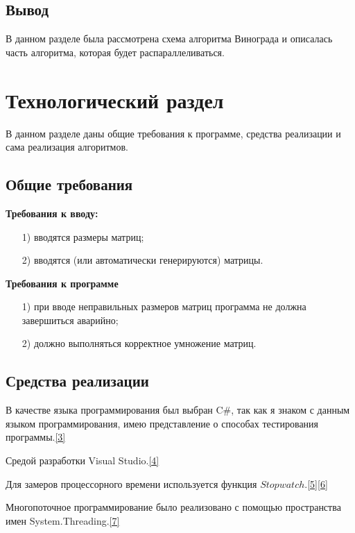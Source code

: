 \documentclass[14pt, a4paper]{extarticle}
\begin{document}
\subsection{Вывод}
В данном разделе была рассмотрена схема алгоритма Винограда и описалась часть алгоритма, которая будет распараллеливаться.

\clearpage
\section{Технологический раздел}
В данном разделе даны общие требования к программе, средства реализации и сама реализация алгоритмов.
\subsection{Общие требования}
\textbf{Требования к вводу:}
\begin{enumerate}
	\item[1)] вводятся размеры матриц;
	\item[2)] вводятся (или автоматически генерируются) матрицы. 
\end{enumerate}\par
\textbf{Требования к программе}
\begin{enumerate}
	\item[1)] при вводе неправильных размеров матриц программа не должна завершиться аварийно;
	\item[2)] должно выполняться корректное умножение матриц.
\end{enumerate}
\subsection{Средства реализации}
В качестве языка программирования был выбран C\#, так как я знаком с данным языком программирования, имею представление о способах тестирования программы.\hyperref[literature]{[3]}\par
Средой разработки Visual Studio.\hyperref[literature]{[4]}\par 
Для замеров процессорного времени используется функция $Stopwatch$.\hyperref[literature]{[5]}\hyperref[literature]{[6]}\par
Многопоточное программирование было реализовано с помощью пространства имен System.Threading.\hyperref[literature]{[7]}
\end{document}
